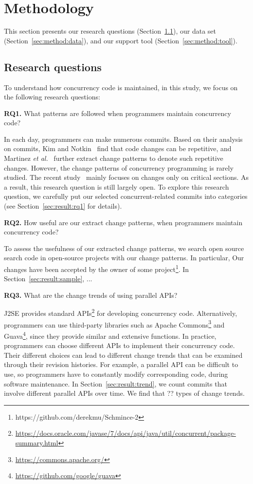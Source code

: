 \section{Methodology}
\label{sec:method}
This section presents our research questions (Section~\ref{sec:method:rq}), our data set (Section~\ref{sec:method:data}), and our support tool (Section~\ref{sec:method:tool}).
\subsection{Research questions}
\label{sec:method:rq}
To understand how concurrency code is maintained, in this study, we focus on the following research questions:

\textbf{RQ1.} What patterns are followed when programmers maintain concurrency code?

In each day, programmers can make numerous commits. Based on their analysis on commits, Kim and Notkin~\cite{conf/icse/KimN09} find that code changes can be repetitive, and Martinez \emph{et al.}~\cite{conf/icsm/MartinezDM13} further extract change patterns to denote such repetitive changes. However, the change patterns of concurrency programming is rarely studied. The recent study~\cite{conf/sigsoft/GuJSZL15} mainly focuses on changes only on critical sections. As a result, this research question is still largely open. To explore this research question, we carefully put our selected concurrent-related commits into  categories (see Section~\ref{sec:result:rq1} for details).


\textbf{RQ2.} How useful are our extract change patterns, when programmers maintain concurrency code?

To assess the usefulness of our extracted change patterns, we search open source search code in open-source projects with our change patterns. In particular,  Our changes have been accepted by the owner of some project\footnote{https://github.com/derekmu/Schmince-2}. In Section~\ref{sec:result:sample}, ...



\textbf{RQ3.} What are the change trends of using parallel APIs?

J2SE provides standard APIs\footnote{\url{https://docs.oracle.com/javase/7/docs/api/java/util/concurrent/package-summary.html}} for developing concurrency code. Alternatively, programmers can use third-party libraries such as Apache Commons\footnote{\url{https://commons.apache.org/}} and Guava\footnote{\url{https://github.com/google/guava}}, since they provide similar and extensive functions. In practice, programmers can choose different APIs to implement their concurrency code. Their different choices can lead to different change trends that can be examined through their revision histories. For example, a parallel API can be difficult to use, so programmers have to constantly modify corresponding code, during software maintenance. In Section~\ref{sec:result:trend}, we count commits that involve different parallel APIs over time. We find that ?? types of change trends. 

